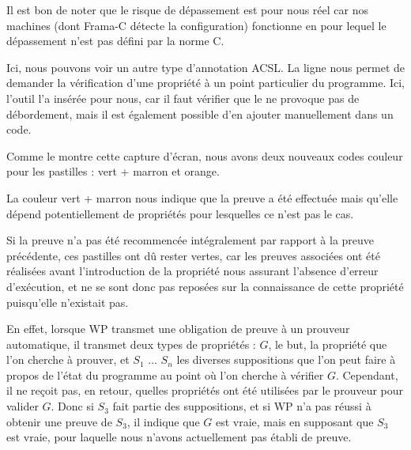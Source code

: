 

\begin{Information}
Il est bon de noter que le risque de dépassement est pour nous réel car nos
machines (dont Frama-C détecte la configuration) fonctionne en 
pour lequel le dépassement n'est pas défini par la norme C.
\end{Information}


Ici, nous pouvons voir un autre type d'annotation ACSL. La 
ligne  nous permet de demander la vérification 
d'une propriété à un point particulier du programme. Ici, l'outil l'a 
insérée pour nous, car il faut vérifier que le  ne provoque pas de 
débordement, mais il est également possible d'en ajouter manuellement dans 
un code.



Comme le montre cette capture d'écran, nous avons deux nouveaux codes couleur
pour les pastilles : vert + marron et orange.



La couleur vert + marron nous indique que la preuve a été effectuée mais 
qu'elle dépend potentiellement de propriétés pour lesquelles ce n'est pas le
cas.



Si  la preuve n'a pas été recommencée intégralement par rapport à la preuve 
précédente, ces pastilles ont dû rester vertes, car les preuves associées ont
été réalisées avant l'introduction de la propriété nous assurant l'absence 
d'erreur d'exécution, et ne se sont donc pas reposées sur la connaissance de
cette propriété puisqu'elle n'existait pas.



En effet, lorsque WP transmet une obligation de preuve à un prouveur automatique,
il transmet deux types de propriétés : $G$, le but, la propriété 
que l'on cherche à prouver, et $S_1$ ... $S_n$ les diverses suppositions que l'on
peut faire à propos de l'état du programme au point où l'on cherche à vérifier $G$.
Cependant, il ne reçoit pas, en retour, quelles propriétés ont été utilisées par
le prouveur pour valider $G$. Donc si $S_3$ fait partie des suppositions, et si
WP n'a pas réussi à obtenir une preuve de $S_3$, il indique que $G$ est vraie, mais
en supposant que $S_3$ est vraie, pour laquelle nous n'avons actuellement pas
établi de preuve.



